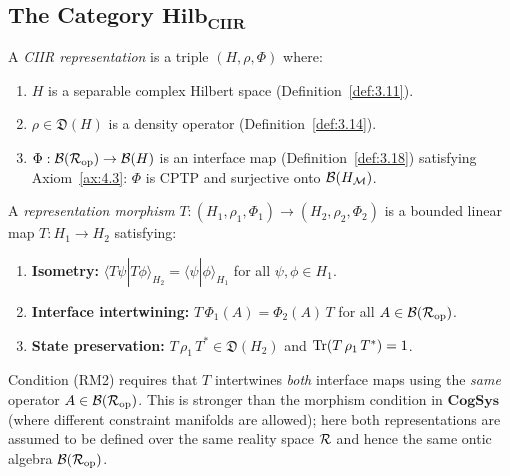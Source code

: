 \subsection{The Category \texorpdfstring{$\mathbf{Hilb_{CIIR}}$}{Hilb-CIIR}}
\label{sec:ch6:hilb}

\begin{definition}
\label{def:6.5}
A \emph{CIIR representation} is a triple
$(H, \rho, \Phi)$ where:
\begin{enumerate}
  \item[\textup{(i)}] $H$ is a separable complex Hilbert space
    (Definition~\ref{def:3.11}).
  \item[\textup{(ii)}] $\rho \in \mathfrak{D}(H)$ is a density
    operator (Definition~\ref{def:3.14}).
  \item[\textup{(iii)}] $\Phi : \mathcal{B}(\mathcal{R}_{\mathrm{op}}) \to \mathcal{B}(H)$
    is an interface map (Definition~\ref{def:3.18}) satisfying
    Axiom~\ref{ax:4.3}: $\Phi$ is CPTP and surjective onto
    $\mathcal{B}(H_{\mathcal{M}})$.
\end{enumerate}
\end{definition}

\begin{definition}
\label{def:6.6}
A \emph{representation morphism}
$T : (H_1, \rho_1, \Phi_1) \to (H_2, \rho_2, \Phi_2)$
is a bounded linear map $T : H_1 \to H_2$ satisfying:
\begin{enumerate}
  \item[\textup{(RM1)}] \textbf{Isometry:}
    $\langle T\psi | T\phi \rangle_{H_2}
    = \langle \psi | \phi \rangle_{H_1}$
    for all $\psi, \phi \in H_1$.
  \item[\textup{(RM2)}] \textbf{Interface intertwining:}
    $T\,\Phi_1(A) = \Phi_2(A)\,T$
    for all $A \in \mathcal{B}(\mathcal{R}_{\mathrm{op}})$.
  \item[\textup{(RM3)}] \textbf{State preservation:}
    $T\,\rho_1\,T^* \in \mathfrak{D}(H_2)$ and
    $\mathrm{Tr}(T\,\rho_1\,T^*) = 1$.
\end{enumerate}
\end{definition}

\begin{remark}
\label{rem:6.2}
Condition (RM2) requires that $T$ intertwines \emph{both} interface
maps using the \emph{same} operator $A \in \mathcal{B}(\mathcal{R}_{\mathrm{op}})$.
This is stronger than the morphism condition in $\mathbf{CogSys}$
(where different constraint manifolds are allowed); here both
representations are assumed to be defined over the same reality space
$\mathcal{R}$ and hence the same ontic algebra $\mathcal{B}(\mathcal{R}_{\mathrm{op}})$.
\end{remark}

